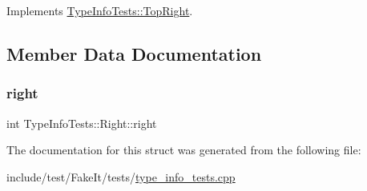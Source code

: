 Implements \mbox{\hyperlink{structTypeInfoTests_1_1TopRight_af9b534118679084c831b0e6e9b373109}{Type\+Info\+Tests\+::\+Top\+Right}}.



\subsection{Member Data Documentation}
\mbox{\label{structTypeInfoTests_1_1Right_ae7131ff36583a96aa05057b833c995a0}} 
\subsubsection{\texorpdfstring{right}{right}}
{\footnotesize\ttfamily int Type\+Info\+Tests\+::\+Right\+::right}



The documentation for this struct was generated from the following file\+:\begin{DoxyCompactItemize}
\item 
include/test/\+Fake\+It/tests/\mbox{\hyperlink{type__info__tests_8cpp}{type\+\_\+info\+\_\+tests.\+cpp}}\end{DoxyCompactItemize}
